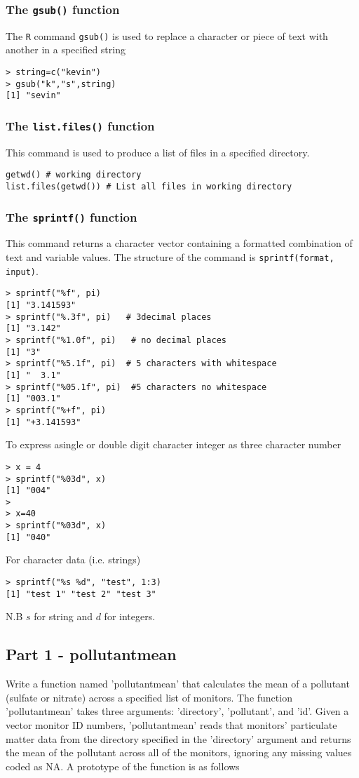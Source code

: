 \documentclass[]{article}
\begin{document}
\subsubsection{The \texttt{gsub()} function}
The \texttt{R} command \texttt{gsub()} is used to replace a character or piece of text with another in a specified string
\begin{verbatim}
> string=c("kevin")
> gsub("k","s",string)
[1] "sevin"
\end{verbatim}
\newpage
\subsubsection{The \texttt{list.files()} function}
This command is used to produce a list of files in a specified directory.
\begin{framed}
\begin{verbatim}
getwd() # working directory
list.files(getwd()) # List all files in working directory
\end{verbatim}
\end{framed}
\subsubsection{The \texttt{sprintf()} function}
This command returns a character vector containing a formatted combination of text and variable values. The structure of the command is \texttt{sprintf(format, input)}.
\begin{verbatim}
> sprintf("%f", pi)     
[1] "3.141593"
> sprintf("%.3f", pi)   # 3decimal places
[1] "3.142"
> sprintf("%1.0f", pi)   # no decimal places
[1] "3"
> sprintf("%5.1f", pi)  # 5 characters with whitespace
[1] "  3.1"  
> sprintf("%05.1f", pi)  #5 characters no whitespace
[1] "003.1"
> sprintf("%+f", pi)
[1] "+3.141593"
\end{verbatim}

To express asingle or double digit character integer as three character number
\begin{verbatim}
> x = 4
> sprintf("%03d", x)
[1] "004"
> 
> x=40
> sprintf("%03d", x)
[1] "040"
\end{verbatim}

For character data (i.e. strings) 
\begin{verbatim}
> sprintf("%s %d", "test", 1:3)
[1] "test 1" "test 2" "test 3"
\end{verbatim}
N.B $s$ for string and $d$ for integers.
\newpage
\subsection*{Part 1 - pollutantmean}
Write a function named 'pollutantmean' that calculates the mean of a pollutant (sulfate or nitrate) across a specified list of monitors. The function 'pollutantmean' takes three arguments: 'directory', 'pollutant', and 'id'. Given a vector monitor ID numbers, 'pollutantmean' reads that monitors' particulate matter data from the directory specified in the 'directory' argument and returns the mean of the pollutant across all of the monitors, ignoring any missing values coded as NA. A prototype of the function is as follows
\end{document}
